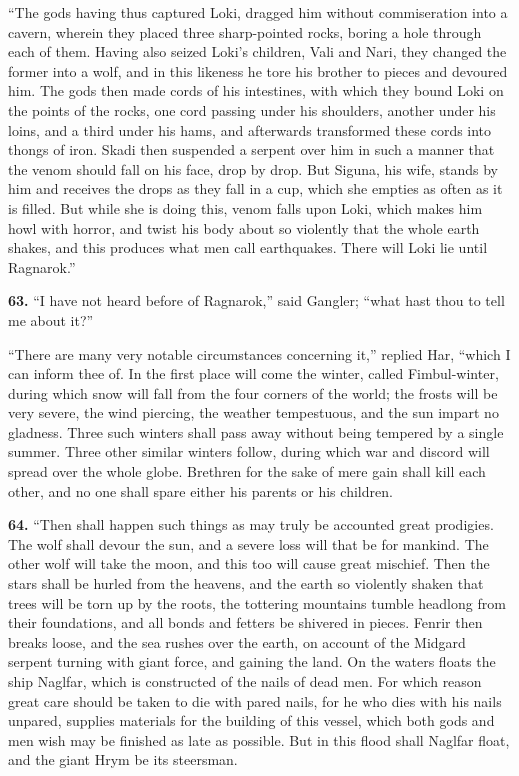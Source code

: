 ``The gods having thus captured Loki, dragged him without commiseration
into a cavern, wherein they placed three sharp-pointed rocks, boring a
hole through each of them. Having also seized Loki's children, Vali
and Nari, they changed the former into a wolf, and in this likeness he
tore his brother to pieces and devoured him. The gods then made cords
of his intestines, with which they bound Loki on the points of the
rocks, one cord passing under his shoulders, another under his loins,
and a third under his hams, and afterwards transformed these cords
into thongs of iron. Skadi then suspended a serpent over him in such a
manner that the venom should fall on his face, drop by drop. But
Siguna, his wife, stands by him and receives the drops as they fall in
a cup, which she empties as often as it is filled. But while she is
doing this, venom falls upon Loki, which makes him howl with horror,
and twist his body about so violently that the whole earth shakes, and
this produces what men call earthquakes. There will Loki lie until
Ragnarok.''


\textbf{63.} ``I have not heard before of Ragnarok,'' said Gangler; ``what hast
thou to tell me about it?''

``There are many very notable circumstances concerning it,'' replied
Har, ``which I can inform thee of. In the first place will come the
winter, called Fimbul-winter, during which snow will fall from the
four corners of the world; the frosts will be very severe, the wind
piercing, the weather tempestuous, and the sun impart no gladness.
Three such winters shall pass away without being tempered by a single
summer. Three other similar winters follow, during which war and
discord will spread over the whole globe. Brethren for the sake of
mere gain shall kill each other, and no one shall spare either his
parents or his children.

\textbf{64.} ``Then shall happen such things as may truly be accounted great
prodigies. The wolf shall devour the sun, and a severe loss will that
be for mankind. The other wolf will take the moon, and this too will
cause great mischief. Then the stars shall be hurled from the heavens,
and the earth so violently shaken that trees will be torn up by the
roots, the tottering mountains tumble headlong from their foundations,
and all bonds and fetters be shivered in pieces. Fenrir then breaks
loose, and the sea rushes over the earth, on account of the Midgard
serpent turning with giant force, and gaining the land. On the waters
floats the ship Naglfar, which is constructed of the nails of dead
men. For which reason great care should be taken to die with pared
nails, for he who dies with his nails unpared, supplies materials for
the building of this vessel, which both gods and men wish may be
finished as late as possible. But in this flood shall Naglfar float,
and the giant Hrym be its steersman.

